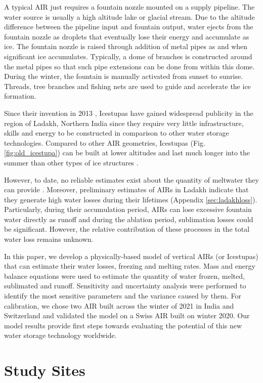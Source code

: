 \documentclass[utf8]{frontiersSCNS}
\begin{document}
A typical AIR just requires a fountain nozzle mounted on a supply pipeline. The water source is usually a high
altitude lake or glacial stream. Due to the altitude difference between the pipeline input and fountain output,
water ejects from the fountain nozzle as droplets that eventually lose their energy and accumulate as ice. The
fountain nozzle is raised through addition of metal pipes as and when significant ice accumulates.  Typically, a
dome of branches is constructed around the metal pipes so that such pipe extensions can be done from within this
dome. During the winter, the fountain is manually activated from sunset to sunrise.  Threads, tree branches and
fishing nets are used to guide and accelerate the ice formation.

Since their invention in 2013 \citep{campaign}, Icestupas have gained widespread publicity in the region of
Ladakh, Northern India since they require very little infrastructure, skills and energy to be constructed in
comparison to other water storage technologies. Compared to other AIR geometries, Icestupas (Fig.
\ref{fig:old_icestupa}) can be built at lower altitudes and last much longer into the summer than other types of
ice structures \citep{campaign}.

However, to date, no reliable estimates exist about the quantity of meltwater they can provide
\citep{Nusser_2018} . Moreover, preliminary estimates of AIRs in Ladakh indicate that they generate high water
losses during their lifetimes (Appendix \ref{sec:ladakhloss}). Particularly, during their accumulation period,
AIRs can lose excessive fountain water directly as runoff and during the ablation period, sublimation losses
could be significant.  However, the relative contribution of these processes in the total water loss remains
unknown.

In this paper, we develop a physically-based model of vertical AIRs (or Icestupas) that can estimate their water
losses, freezing and melting rates. Mass and energy balance equations were used to estimate the quantity of
water frozen, melted, sublimated and runoff. Sensitivity and uncertainty analysis were performed to identify the
most sensitive parameters and the variance caused by them. For calibration, we chose two AIR built across the
winter of 2021 in India and Switzerland and validated the model on a Swiss AIR built on winter 2020. Our model
results provide first steps towards evaluating the potential of this new water storage technology worldwide.

\section{Study Sites}
\end{document}
